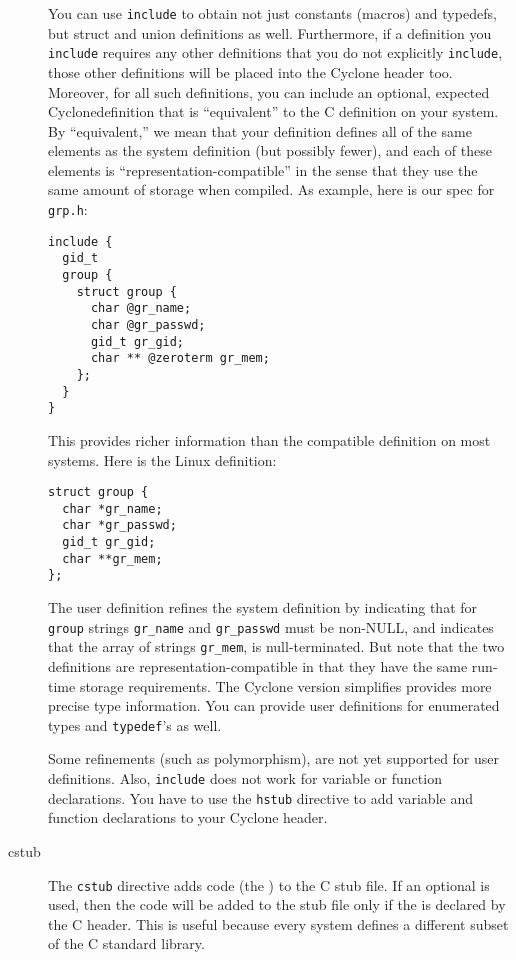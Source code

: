 \begin{description}
You can use \texttt{include} to obtain not just constants (macros) and
typedefs, but struct and union definitions as well.  Furthermore, if a
definition you \texttt{include} requires any other definitions that you do
not explicitly \texttt{include}, those other definitions will be placed into
the Cyclone header too.  Moreover, for all such definitions, you can include
an optional, expected Cyclonedefinition that is ``equivalent'' to the C
definition on your system.  By ``equivalent,'' we mean that your definition
defines all of the same elements as the system definition (but possibly
fewer), and each of these elements is ``representation-compatible'' in the
sense that they use the same amount of storage when compiled.  As example,
here is our spec for \texttt{grp.h}:
\begin{verbatim}
include {
  gid_t
  group {
    struct group {
      char @gr_name;
      char @gr_passwd;
      gid_t gr_gid;
      char ** @zeroterm gr_mem;
    };  
  }
}
\end{verbatim}
This provides richer information than the compatible definition on most
systems.  Here is the Linux definition:
\begin{verbatim}
struct group {
  char *gr_name;
  char *gr_passwd;
  gid_t gr_gid;
  char **gr_mem;
};  
\end{verbatim}
The user definition refines the system definition by indicating that for
\texttt{group} strings \texttt{gr\_name} and \texttt{gr\_passwd} must be
non-NULL, and indicates that the array of strings \texttt{gr\_mem}, is
null-terminated.  But note that the two definitions are
representation-compatible in that they have the same run-time storage
requirements.  The Cyclone version simplifies provides more precise type
information.  You can provide user definitions for enumerated types and
\texttt{typedef}'s as well.

Some refinements (such as polymorphism), are not yet supported for user
definitions.  Also, \texttt{include} does not work for variable or function
declarations.  You have to use the \texttt{hstub} directive to add variable
and function declarations to your Cyclone header.

\item[cstub]
The \texttt{cstub} directive adds code (the )
to the C stub file.  If an optional  is used, then the code
will be added to the stub file only if the  is declared by the
C header.  This is useful because every system defines a different
subset of the C standard library.


\end{description}
